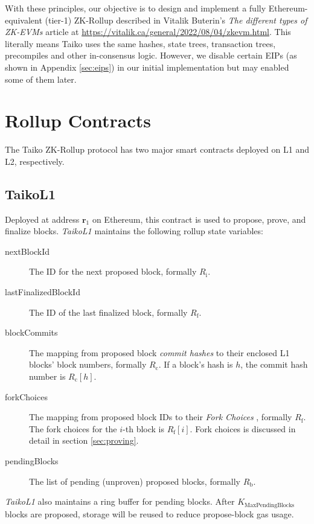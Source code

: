 \documentclass[9pt,oneside]{amsart}
\begin{document}
\begin{multicols}{2}
With these principles, our objective is to design and implement a fully Ethereum-equivalent (tier-1) ZK-Rollup described in Vitalik Buterin's \textit{The different types of ZK-EVMs} article at \url{https://vitalik.ca/general/2022/08/04/zkevm.html}. This literally means Taiko uses the same hashes, state trees, transaction trees, precompiles and  other in-consensus logic. However, we disable certain EIPs (as shown in Appendix \ref{sec:eips}) in our initial implementation but may enabled some of them later.

\section{Rollup Contracts}
The Taiko ZK-Rollup protocol has two major smart contracts deployed on L1 and L2, respectively.

\subsection{TaikoL1} Deployed at address $\mathbf{r_{\mathrm{1}}}$ on Ethereum, this contract is used to propose, prove, and finalize blocks. \textit{TaikoL1}  maintains the following rollup state variables:

\begin{description}
\item[nextBlockId] The ID for the next proposed block, formally $R_\mathrm{i}$.
\item[lastFinalizedBlockId] The ID of the last finalized block, formally $R_\mathrm{f}$.
\item [blockCommits] The mapping from proposed block \textit{commit hashes} to their enclosed L1 blocks' block numbers, formally $R_\mathrm{c}$. If a block's hash is $h$, the commit hash number is $R_\mathrm{c}[h]$.
\item[forkChoices] The mapping from proposed block IDs to their \textit{Fork Choices} , formally $R_\mathrm{f}$. The fork choices for the $i$-th block is $R_\mathrm{f}[i]$. Fork choices is discussed in detail in section \ref{sec:proving}.
\item[pendingBlocks] The list of pending (unproven) proposed blocks, formally $R_\mathrm{b}$.
\end{description}


\textit{TaikoL1} also maintains a ring buffer for pending blocks. After $K_{\mathrm{MaxPendingBlocks}}$ blocks are proposed, storage will be reused to reduce propose-block gas usage.


\end{multicols}
\end{document}
